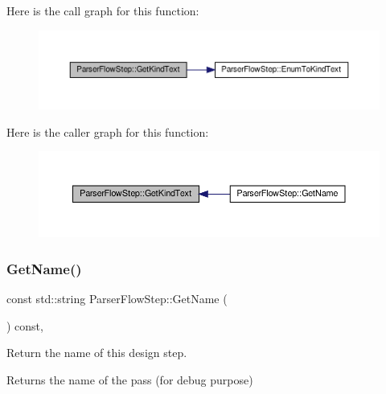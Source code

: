 Here is the call graph for this function\+:
\nopagebreak
\begin{figure}[H]
\begin{center}
\leavevmode
\includegraphics[width=350pt]{dd/d99/classParserFlowStep_a36b924fdaa571a7581c91586c22a3ff7_cgraph}
\end{center}
\end{figure}
Here is the caller graph for this function\+:
\nopagebreak
\begin{figure}[H]
\begin{center}
\leavevmode
\includegraphics[width=350pt]{dd/d99/classParserFlowStep_a36b924fdaa571a7581c91586c22a3ff7_icgraph}
\end{center}
\end{figure}
\mbox{\label{classParserFlowStep_adc59d75712212fd7d908550665d5719b}} 
\subsubsection{\texorpdfstring{Get\+Name()}{GetName()}}
{\footnotesize\ttfamily const std\+::string Parser\+Flow\+Step\+::\+Get\+Name (\begin{DoxyParamCaption}{ }\end{DoxyParamCaption}) const\hspace{0.3cm}{\ttfamily [override]}, {\ttfamily [virtual]}}



Return the name of this design step. 

\begin{DoxyReturn}{Returns}
the name of the pass (for debug purpose) 
\end{DoxyReturn}


